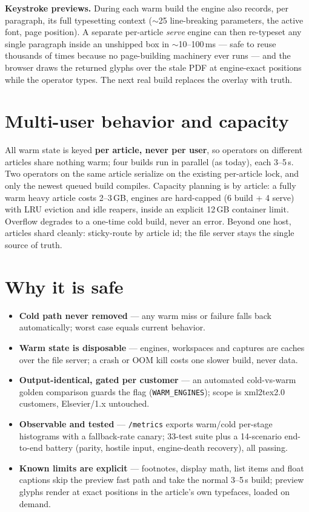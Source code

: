 \documentclass[10pt]{article}
\begin{document}
\textbf{Keystroke previews.} During each warm build the engine also
records, per paragraph, its full typesetting context ($\sim$25
line-breaking parameters, the active font, page position). A separate
per-article \emph{serve} engine can then re-typeset any single
paragraph inside an unshipped box in $\sim$10--100\,ms --- safe to
reuse thousands of times because no page-building machinery ever runs
--- and the browser draws the returned glyphs over the stale PDF at
engine-exact positions while the operator types. The next real build
replaces the overlay with truth.

\begin{center}
\resizebox{0.98\textwidth}{!}{}
\end{center}

\section*{Multi-user behavior and capacity}

All warm state is keyed \textbf{per article, never per user}, so
operators on different articles share nothing warm; four builds run in
parallel (as today), each 3--5\,s. Two operators on the same article
serialize on the existing per-article lock, and only the newest queued
build compiles. Capacity planning is by article: a fully warm heavy
article costs 2--3\,GB, engines are hard-capped (6 build + 4 serve)
with LRU eviction and idle reapers, inside an explicit 12\,GB container
limit. Overflow degrades to a one-time cold build, never an error.
Beyond one host, articles shard cleanly: sticky-route by article id;
the file server stays the single source of truth.

\section*{Why it is safe}

\begin{itemize}
\item \textbf{Cold path never removed} --- any warm miss or failure
  falls back automatically; worst case equals current behavior.
\item \textbf{Warm state is disposable} --- engines, workspaces and
  captures are caches over the file server; a crash or OOM kill costs
  one slower build, never data.
\item \textbf{Output-identical, gated per customer} --- an automated
  cold-vs-warm golden comparison guards the flag
  (\texttt{WARM\_ENGINES}); scope is xml2tex2.0 customers, Elsevier/1.x
  untouched.
\item \textbf{Observable and tested} --- \texttt{/metrics} exports
  warm/cold per-stage histograms with a fallback-rate canary; 33-test
  suite plus a 14-scenario end-to-end battery (parity, hostile input,
  engine-death recovery), all passing.
\item \textbf{Known limits are explicit} --- footnotes, display math,
  list items and float captions skip the preview fast path and take the
  normal 3--5\,s build; preview glyphs render at exact positions in the
  article's own typefaces, loaded on demand.
\end{itemize}
\end{document}
